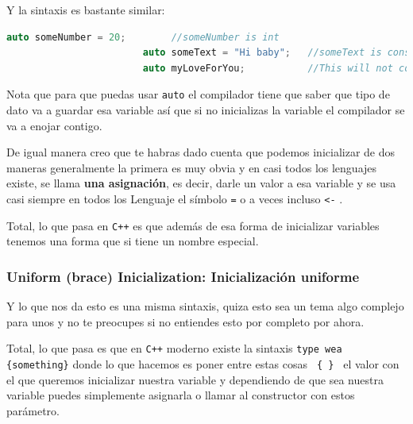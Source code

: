 \documentclass[12pt, fleqn]{report}                             %
\theoremstyle{break}                                            %
\newcommand{\textCode}[1]  { \texttt{#1} }                      %
\newcommand{\Cpp}{\ignorespaces\textCode{C++}}                  %
\begin{document}
                    Y la sintaxis es bastante similar:
                    \begin{lstlisting}[language=C++, gobble=24]
                        auto someNumber = 20;        //someNumber is int
                        auto someText = "Hi baby";   //someText is const char* (this is sad)
                        auto myLoveForYou;           //This will not compile :v
                    \end{lstlisting}

                    Nota que para que puedas usar \textCode{auto} el compilador tiene que saber que tipo
                    de dato va a guardar esa variable así que si no inicializas la variable 
                    el compilador se va a enojar contigo.

                    De igual manera creo que te habras dado cuenta que podemos inicializar de dos maneras
                    generalmente la primera es muy obvia y en casi todos los lenguajes existe, se llama
                    \textbf{una asignación}, es decir, darle un valor a esa variable y se usa casi siempre en
                    todos los Lenguaje el símbolo \textCode{=} o a veces incluso \textCode{<-}.

                    Total, lo que pasa en \Cpp es que además de esa forma de inicializar variables tenemos
                    una forma que si tiene un nombre especial.

                \subsubsection{Uniform (brace) Inicialization: Inicialización uniforme}

                    Y lo que nos da esto es una misma sintaxis, quiza esto sea un tema algo complejo
                    para unos y no te preocupes si no entiendes esto por completo por ahora.

                    Total, lo que pasa es que en \Cpp moderno existe la sintaxis 
                    \textCode{type wea \{something\}} donde lo que hacemos es poner entre estas cosas
                    \textCode{ \{ \} } el valor con el que queremos inicializar nuestra variable y dependiendo
                    de que sea nuestra variable puedes simplemente asignarla o llamar al constructor con estos
                    parámetro.
\end{document}
